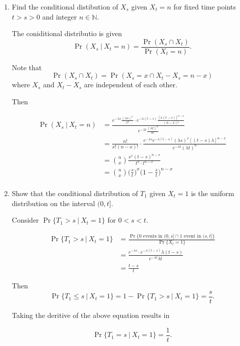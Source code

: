 \documentclass{tufte-book}
\begin{document}
\begin{enumerate}

\item Find the conditional distibution of $X_s$ given $X_t=n$ for fixed time points $t>s>0$ and integer $n \in \mathbb{N}$.

The coniditional distributio is given
\[ \Pr(X_s \ | \ X_t = n) = \frac{\Pr(X_s \cap X_t)}{\Pr(X_t=n)}. \]

Note that
\[ \Pr(X_s \cap X_t) = \Pr(X_s = x \cap X_t-X_s=n-x) \]
where $X_s$ and $X_t - X_s$ are independent of each other.

Then

\begin{align*}
\Pr(X_s \ | \ X_t = n) &= \frac{ e^{-\lambda s} \frac{(\lambda s)^x}{x!} \cdot e^{-\lambda(t-s)} \frac{[\lambda(t-s)]^{n-x}}{(n-x)!}}{e^{-\lambda t}\frac{(\lambda t)^n}{n!}}\\
&= \frac{n!}{x!(n-x)!} \cdot \frac{e^{-\lambda s} e^{-\lambda(t-s)} (\lambda s)^x [(t-s)\lambda]^{n-x}}{e^{-\lambda t} (\lambda t)^n} \\
&= \binom{n}{x} \frac{s^x (t-s)^{n-x}}{t^x \cdot t^{n-x}}\\
&= \binom{n}{x} \big(\frac{s}{t}\big)^x \big(1-\frac{s}{t}\big)^{n-x}\\
\end{align*}

\item Show that the conditional distribution of $T_1$ given $X_t=1$ is the uniform distribution on the interval $(0, t]$.

Consider $\Pr\{T_1 > s \ | \ X_t=1\}$ for $0<s<t$.

\begin{align*}
\Pr\{T_1 > s \ | \ X_t=1\} &= \frac{ \Pr\{ 0\text{ events in } (0,s] \cap 1 \text{ event in }(s,t]\}}{\Pr\{X_t=1\}}\\
&= \frac{ e^{-\lambda s} \cdot e^{-\lambda(t-s)} \lambda(t-s)}{e^{-\lambda t}\lambda t} \\
&= \frac{t-s}{t}
\end{align*}

Then
\[ \Pr\{T_1 \leq s \ | \ X_t=1\} = 1-\Pr\{T_1 > s \ | \ X_t=1\} = \frac{s}{t}. \]

Taking the deritive of the above equation results in

\[ \Pr\{T_1 = s \ | \ X_t=1\} = \frac{1}{t}. \]


\end{enumerate}
\end{document}
